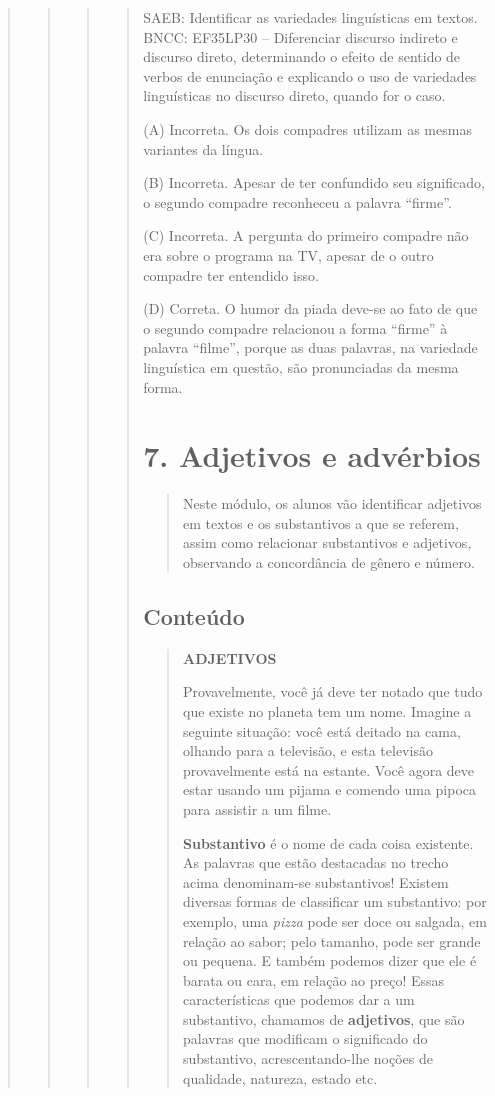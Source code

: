 \begin{quote}
\begin{quote}
\begin{quote}
\begin{quote}
SAEB: Identificar as variedades linguísticas em textos.
BNCC: EF35LP30 -- Diferenciar discurso indireto e discurso direto,
determinando o efeito de sentido de verbos de enunciação e explicando o
uso de variedades linguísticas no discurso direto, quando for o caso.

(A) Incorreta. Os dois compadres utilizam as mesmas variantes da língua.

(B) Incorreta. Apesar de ter confundido seu significado, o segundo compadre reconheceu a palavra ``firme''.

(C) Incorreta. A pergunta do primeiro compadre não era sobre o programa na TV, apesar de o outro compadre ter entendido isso.

(D) Correta. O humor da piada deve-se ao fato de que o segundo compadre relacionou a forma ``firme'' à palavra ``filme'', porque as duas palavras, na variedade linguística em questão, são pronunciadas da mesma forma.

\section{7. Adjetivos e advérbios}\label{muxf3dulo-7}

\begin{quote}
Neste módulo, os alunos vão identificar adjetivos em textos e os
substantivos a que se referem, assim como relacionar substantivos e
adjetivos, observando a concordância de gênero e número.
\end{quote}

\subsection{Conteúdo}\label{conteuxfado-6}

\begin{quote}
\textbf{ADJETIVOS}

Provavelmente, você já deve ter notado que tudo que existe no planeta
tem um nome. Imagine a seguinte situação: você está deitado na cama,
olhando para a televisão, e esta televisão provavelmente está na
estante. Você agora deve estar usando um pijama e comendo uma pipoca
para assistir a um filme.

\textbf{Substantivo} é o nome de cada coisa existente. As palavras que
estão destacadas no trecho acima denominam-se substantivos! Existem
diversas formas de classificar um substantivo: por exemplo, uma
\emph{pizza} pode ser doce ou salgada, em relação ao sabor; pelo
tamanho, pode ser grande ou pequena. E também podemos dizer que ele é
barata ou cara, em relação ao preço! Essas características que podemos
dar a um substantivo, chamamos de \textbf{adjetivos}, que são palavras
que modificam o significado do substantivo, acrescentando-lhe noções de
qualidade, natureza, estado etc.


\end{quote}
\end{quote}
\end{quote}
\end{quote}
\end{quote}
